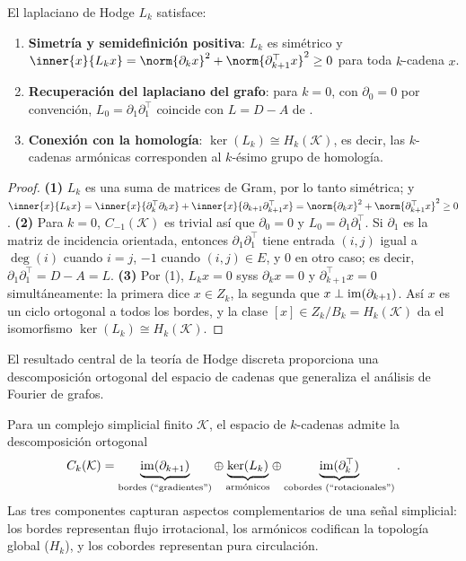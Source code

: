 \begin{proposition}
\label{prop:graphs:hodge-props}
El laplaciano de Hodge $L_k$ satisface:
\begin{enumerate}
  \item \textbf{Simetr\'ia y semidefinici\'on positiva}: $L_k$ es sim\'etrico y
        $\inner{x}{L_k x} = \norm{\partial_k x}^2 + \norm{\partial_{k+1}^\top x}^2
        \ge 0$ para toda $k$-cadena $x$.
  \item \textbf{Recuperaci\'on del laplaciano del grafo}: para $k = 0$, con
        $\partial_0 = 0$ por convenci\'on, $L_0 = \partial_1 \partial_1^\top$
        coincide con $L = D - A$ de .
  \item \textbf{Conexi\'on con la homolog\'ia}: $\ker(L_k) \cong H_k(\mathcal{K})$,
        es decir, las $k$-cadenas arm\'onicas corresponden al $k$-\'esimo grupo de
        homolog\'ia.
\end{enumerate}
\end{proposition}

\begin{proof}
\textbf{(1)} $L_k$ es una suma de matrices de Gram, por lo tanto sim\'etrica; y
$\inner{x}{L_k x} = \inner{x}{\partial_k^\top \partial_k x}
+ \inner{x}{\partial_{k+1}\partial_{k+1}^\top x}
= \norm{\partial_k x}^2 + \norm{\partial_{k+1}^\top x}^2 \ge 0$.
\textbf{(2)} Para $k = 0$, $C_{-1}(\mathcal{K})$ es trivial as\'i que
$\partial_0 = 0$ y $L_0 = \partial_1 \partial_1^\top$. Si $\partial_1$ es la
matriz de incidencia orientada, entonces $\partial_1 \partial_1^\top$ tiene
entrada $(i,j)$ igual a $\deg(i)$ cuando $i = j$, $-1$ cuando $(i,j) \in E$, y $0$
en otro caso; es decir, $\partial_1 \partial_1^\top = D - A = L$. \textbf{(3)}
Por (1), $L_k x = 0$ syss $\partial_k x = 0$ y $\partial_{k+1}^\top x = 0$
simult\'aneamente: la primera dice $x \in Z_k$, la segunda que
$x \perp \operatorname{im}(\partial_{k+1})$. As\'i $x$ es un ciclo ortogonal a todos los bordes,
y la clase $[x] \in Z_k / B_k = H_k(\mathcal{K})$ da el isomorfismo
$\ker(L_k) \cong H_k(\mathcal{K})$.
\end{proof}

El resultado central de la teor\'ia de Hodge discreta proporciona una
descomposici\'on ortogonal del espacio de cadenas que generaliza el an\'alisis de
Fourier de grafos.

\begin{theorem}
\label{thm:graphs:hodge-decomp}
Para un complejo simplicial finito $\mathcal{K}$, el espacio de $k$-cadenas admite
la descomposici\'on ortogonal
\[
  C_k(\mathcal{K})
    = \underbrace{\operatorname{im}(\partial_{k+1})}_{\text{bordes (``gradientes'')}}
    \oplus \underbrace{\ker(L_k)}_{\text{arm\'onicos}}
    \oplus \underbrace{\operatorname{im}(\partial_k^\top)}_{\text{cobordes (``rotacionales'')}} .
\]
Las tres componentes capturan aspectos complementarios de una se\~nal simplicial:
los bordes representan flujo irrotacional, los arm\'onicos codifican la topolog\'ia
global ($H_k$), y los cobordes representan pura circulaci\'on.
\end{theorem}

